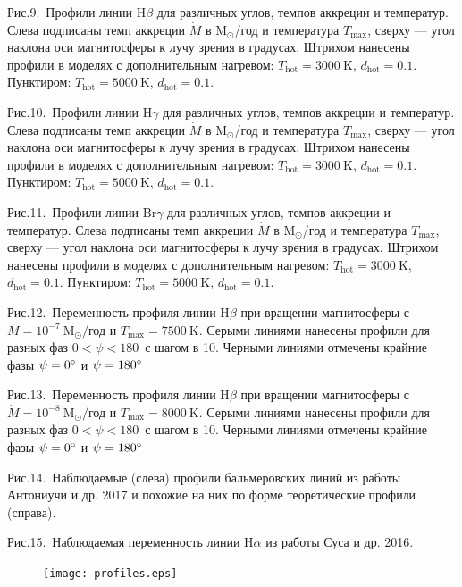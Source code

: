 \documentclass{article}
\begin{document}
Рис.9.~Профили линии $\text{H}\beta$ для различных углов, темпов аккреции и температур. Слева подписаны темп аккреции $\dot{M}$ в $\text{M}_\odot$/год и температура $T_\text{max}$, сверху --- угол наклона оси магнитосферы к лучу зрения в градусах. Штрихом нанесены профили в моделях с дополнительным нагревом: $T_\text{hot} = 3000\ \text{K}$, $d_\text{hot} = 0.1$. Пунктиром: $T_\text{hot} = 5000\ \text{K}$, $d_\text{hot} = 0.1$.

Рис.10.~Профили линии $\text{H}\gamma$ для различных углов, темпов аккреции и температур. Слева подписаны темп аккреции $\dot{M}$ в $\text{M}_\odot$/год и температура $T_\text{max}$, сверху --- угол наклона оси магнитосферы к лучу зрения в градусах. Штрихом нанесены профили в моделях с дополнительным нагревом: $T_\text{hot} = 3000\ \text{K}$, $d_\text{hot} = 0.1$. Пунктиром: $T_\text{hot} = 5000\ \text{K}$, $d_\text{hot} = 0.1$.

Рис.11.~Профили линии $\text{Br}\gamma$ для различных углов, темпов аккреции и температур. Слева подписаны темп аккреции $\dot{M}$ в $\text{M}_\odot$/год и температура $T_\text{max}$, сверху --- угол наклона оси магнитосферы к лучу зрения в градусах. Штрихом нанесены профили в моделях с дополнительным нагревом: $T_\text{hot} = 3000\ \text{K}$, $d_\text{hot} = 0.1$. Пунктиром: $T_\text{hot} = 5000\ \text{K}$, $d_\text{hot} = 0.1$.

Рис.12.~Переменность профиля линии H$\beta$ при вращении магнитосферы с $\dot{M} = 10^{-7}\ \text{M}_\odot/$год и $T_\text{max} = 7500\ \text{K}$. Серыми линиями нанесены профили для разных фаз $0$\degree$< \psi < 180$\degree\ с шагом в 10\degree. Черными линиями отмечены крайние фазы $\psi = 0\text{\degree}$ и $\psi = 180\text{\degree}$

Рис.13.~Переменность профиля линии H$\beta$ при вращении магнитосферы с $\dot{M} = 10^{-8}\ \text{M}_\odot/$год и $T_\text{max} = 8000\ \text{K}$. Серыми линиями нанесены профили для разных фаз $0$\degree$< \psi < 180$\degree\ с шагом в 10\degree. Черными линиями отмечены крайние фазы $\psi = 0\text{\degree}$ и $\psi = 180\text{\degree}$

Рис.14.~Наблюдаемые (слева) профили бальмеровских линий из работы Антониучи и др. 2017 и похожие на них по форме теоретические профили (справа).

Рис.15.~Наблюдаемая переменность линии H$\alpha$ из работы Суса и др. 2016.

\clearpage


\begin{figure}[h] 
\centering
\texttt{[image: profiles.eps]}
\caption{\rm}
\label{fig:profiles}
\end{figure}
\end{document}

